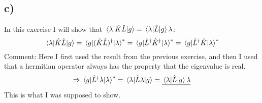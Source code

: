\documentclass{scrartcl}
\begin{document}
\subsection*{c)}
In this exercise I will show that $\mel*{\lambda}{\hat{K}\hat{L}}{g}=\mel*{\lambda}{\hat{L}}{g}\lambda$:
$$\mel*{\lambda}{\hat{K}\hat{L}}{g}=\mel*{g}{(\hat{K}\hat{L})^\dagger}{\lambda}^*=\mel*{g}{\hat{L}^\dagger\hat{K}^\dagger}{\lambda}^*=\mel*{g}{\hat{L}^\dagger\hat{K}}{\lambda}^*$$
Comment: Here I first used the result from the previous exercise, and then I used that a hermitian operator always has the property that the eigenvalue is real.
$$\Rightarrow\mel*{g}{\hat{L}^\dagger\lambda}{\lambda}^*=\mel*{\lambda}{\hat{L}\lambda}{g}=\underline{\mel*{\lambda}{\hat{L}}{g}\lambda}$$
This is what I was supposed to show.
\end{document}
